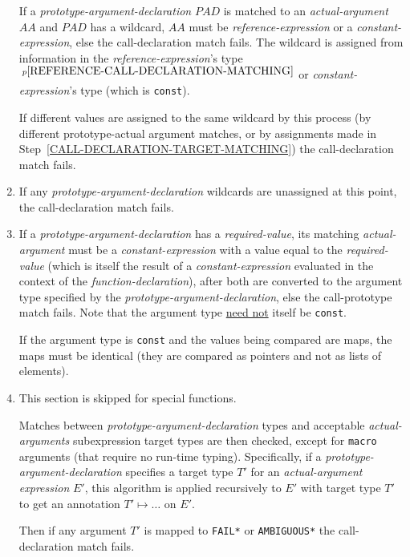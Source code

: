 \documentclass[12pt]{article}
\newcommand{\pagnote}[1]{$\,^{p\pageref{#1}}$}
\begin{document}
\begin{enumerate}
If a {\em prototype-argument-declaration} $PAD$ is matched
to an {\em actual-argument} $AA$ and $PAD$ has a wildcard,
$AA$ must be {\em reference-expression} or a {\em constant-expression},
else the
call-declaration match fails.  The wildcard is assigned from
information in the {\em reference-expression}'s
type \pagnote{REFERENCE-CALL-DECLARATION-MATCHING} or
{\em constant-expression}'s type (which is {\tt const}).

If different values are assigned to the same wildcard by this
process (by different prototype-actual argument matches, or by
assignments made in Step~\ref{CALL-DECLARATION-TARGET-MATCHING})
the call-declaration match fails.

\item\label{CALL-DECLARATION-UNASSIGNED-WILDCARDS}
If any {\em prototype-argument-declaration} wildcards are unassigned
at this point,
the call-declaration match fails.

\item\label{CALL-DECLARATION-REQUIRED-VALUES}
If a {\em prototype-argument-declaration} has a {\em required-value},
its matching {\em actual-argument} must be a {\em constant-expression} with
a value equal to the {\em required-value} (which is itself the result
of a {\em constant-expression} evaluated in the context of the
{\em function-declaration}), after both are converted
to the argument type specified by the {\em prototype-argument-declaration},
else the call-prototype
match fails.  Note that the argument type \underline{need not} itself
be {\tt const}.

If the argument type is {\tt const} and the values being compared are
maps, the maps must be identical (they are compared as pointers and
not as lists of elements).

\item\label{CALL-DECLARATION-ARGUMENT-TYPING}
This section is skipped for special functions.

Matches between {\em prototype-argument-declaration} types
and acceptable {\em actual-argu\-ments} subexpression target types
are then checked, except for {\tt macro} arguments (that require
no run-time typing).  Specifically, if a {\em prototype-argument-declaration}
specifies a target type $T'$ for an {\em actual-argument} {\em expression} $E'$,
this algorithm is applied recursively to $E'$ with target type $T'$ to get
an annotation $T'\mapsto\ldots$ on $E'$.

Then if any argument $T'$ is mapped to {\tt *FAIL*} or {\tt *AMBIGUOUS*}
the call-declaration match fails.


\end{enumerate}
\end{document}
